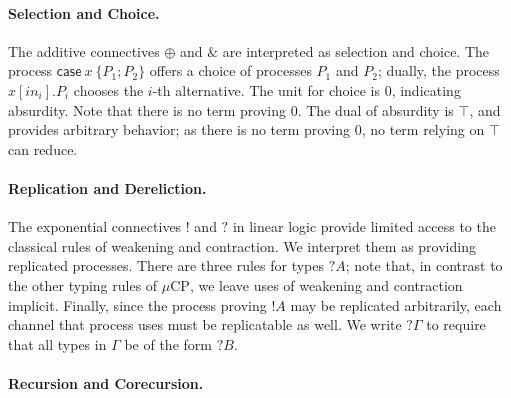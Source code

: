 \documentclass[orivec,envcountsame]{llncs}
\newcommand{\with}{\mathbin\binampersand}
\newcommand{\cpbang}[1]{{! #1}}
\newcommand{\cpquery}[1]{{? #1}}
\newcommand{\mkwd}[1]{\mathsf{#1}}
\newcommand{\clabel}[1]{\mathit{#1}}
\renewcommand{\case}[2]{\mkwd{case}\:#1\:\{#2\}}
\newcommand{\sel}[2]{#1[\clabel{#2}]}
\newcommand{\mucp}{$\mu\mathrm{CP}$\xspace}
\begin{document}
\paragraph{Selection and Choice.}

The additive connectives $\oplus$ and $\with$ are interpreted as selection and choice. The process
$\case{x}{P_1;P_2}$ offers a choice of processes $P_1$ and $P_2$; dually, the process
$\sel{x}{in_i}.P_i$ chooses the $i$-th alternative. The unit for choice is $0$, indicating
absurdity. Note that there is no term proving $0$. The dual of absurdity is $\top$, and provides
arbitrary behavior; as there is no term proving $0$, no term relying on $\top$ can reduce.

\paragraph{Replication and Dereliction.}

The exponential connectives $!$ and $?$ in linear logic provide limited access to the classical
rules of weakening and contraction.  We interpret them as providing replicated processes.
There are three rules for types $\cpquery{A}$; note that, in contrast to the other typing rules of
\mucp, we leave uses of weakening and contraction implicit.  Finally, since the process proving
$\cpbang{A}$ may be replicated arbitrarily, each channel that process uses must be replicatable as
well.  We write $\cpquery{\Gamma}$ to require that all types in $\Gamma$ be of the form
$\cpquery{B}$.

\paragraph{Recursion and Corecursion.}
\end{document}
